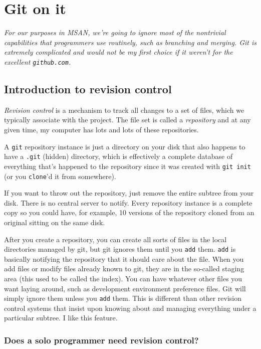 \documentclass[titlepage]{tufte-book}
\begin{document}
\chapter{Git on it}

{\em\small For our purposes in MSAN, we're going to ignore most of the nontrivial capabilities that programmers use routinely, such as branching and merging. Git is extremely  complicated and would not be my first choice if it weren't for the excellent {\tt github.com}.}

\section{Introduction to revision control}

{\em Revision control} is a mechanism to track all changes to a set of files, which we typically associate with the project. The file set is called a {\em repository} and at any given time, my computer has lots and lots of these repositories. 

A {\tt git} repository instance is just a directory on your disk that also happens to have a {\tt .git} (hidden) directory, which is effectively a complete database of everything that's happened to the repository since it was created with {\tt git init} (or you {\tt clone}'d it from somewhere). 

If you want to throw out the repository, just remove the entire subtree from your disk. There is no central server to notify. Every repository instance is a complete copy so you could have, for example, 10 versions of the repository cloned from an original sitting on the same disk.

After you create a repository, you can create all sorts of files in the local directories managed by git, but git ignores them until you {\tt add} them. {\tt add} is basically notifying the repository that it should care about the file. When you add files or modify files already known to git, they are in the so-called staging area (this used to be called the index). You can have whatever other files you want laying around, such as development environment preference files. Git will simply ignore them unless you {\tt add} them. This is different than other revision control systems that insist upon knowing about and managing everything under a particular subtree. I like this feature.

\subsection{Does a solo programmer need revision control?}
\end{document}

